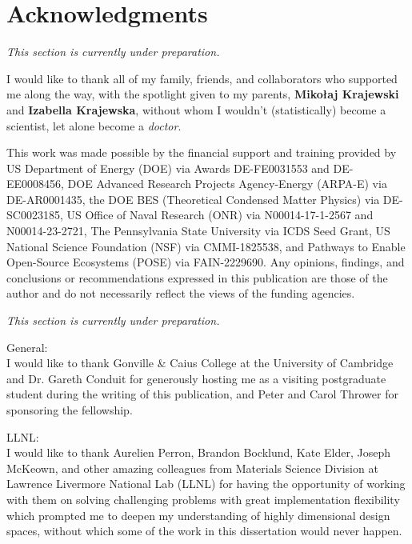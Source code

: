 \documentclass[letterpaper, 12pt]{report}
\newcommand{\todo}{
\begin{center}
\textcolor{mauroblue}{
\textit{
This section is currently under preparation.
}}
\end{center}
}
\begin{document}
\newpage
\tableofcontents

\newpage
{}
\renewcommand{\listfigurename}{List of Figures}
\listoffigures

\newpage
{}
\renewcommand{\listtablename}{List of Tables}
\listoftables

\newpage
\chapter*{Acknowledgments}
\label{acknowledgments}

\todo

I would like to thank all of my family, friends, and collaborators who supported me along the way, with the spotlight given to my parents, \textbf{Mikołaj Krajewski} and \textbf{Izabella Krajewska}, without whom I wouldn't (statistically) become a scientist, let alone become a \emph{doctor}.

This work was made possible by the financial support and training provided by US Department of Energy (DOE) via Awards DE-FE0031553 and DE-EE0008456, DOE Advanced Research Projects Agency-Energy (ARPA-E) via DE-AR0001435, the DOE BES (Theoretical Condensed Matter Physics) via DE-SC0023185, US Office of Naval Research (ONR) via N00014-17-1-2567 and N00014-23-2721, The Pennsylvania State University via ICDS Seed Grant, US National Science Foundation (NSF) via CMMI-1825538, and Pathways to Enable Open-Source Ecosystems (POSE) via FAIN-2229690. Any opinions, findings, and conclusions or recommendations expressed in this publication are those of the author and do not necessarily reflect the views of the funding agencies.

\todo

General:\\
I would like to thank Gonville \& Caius College at the University of Cambridge and Dr. Gareth Conduit for generously hosting me as a visiting postgraduate student during the writing of this publication, and Peter and Carol Thrower for sponsoring the fellowship.

LLNL:\\
I would like to thank Aurelien Perron, Brandon Bocklund, Kate Elder, Joseph McKeown, and other amazing colleagues from Materials Science Division at Lawrence Livermore National Lab (LLNL) for having the opportunity of working with them on solving challenging problems with great implementation flexibility which prompted me to deepen my understanding of highly dimensional design spaces, without which some of the work in this dissertation would never happen.
\end{document}
